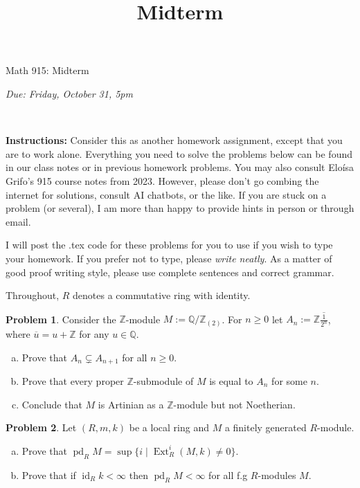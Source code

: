 \documentclass[11pt]{article}
\title{}
\date{\vspace{-0.5in}}
\title{Midterm}
\newcommand{\Z}{\mathbb{Z}}
\theoremstyle{definition}
\newtheorem{problem}{Problem}
\newcommand{\Q}{\mathbb{Q}}
\newcommand{\pd}{\operatorname{pd}}
\newcommand{\Ext}{\operatorname{Ext}}
\begin{document}
\vspace{3em}

\begin{center}
	{\LARGE Math 915: Midterm}
\end{center}
\begin{center}
{\it Due:  Friday, October 31, 5pm}
\end{center}

\

\noindent
{\bf Instructions:}  Consider this as another homework assignment, except that you are to work alone.  Everything you need to solve the problems below can be found in our class notes or in previous homework problems.  You may also consult Elo\'isa Grifo's 915 course notes from 2023.  However, please don't go combing the internet for solutions, consult AI chatbots, or the like.  If you are stuck on a problem (or several), I am more than happy to provide hints in person or through email.  

\medskip
\noindent
I will post the .tex code for these problems for you to use if you wish to type your homework. If you prefer not to type, please  {\em write neatly}. As a matter of good proof writing style, please use complete sentences and correct grammar. 


\medskip
\noindent
Throughout, $R$ denotes a commutative ring with identity.

\medskip

\begin{problem}  Consider the $\Z$-module $M:=\Q/\Z_{(2)}$.  For $n\ge 0$ let $A_n:=\Z \overline{\frac{1}{2^n}}$, where $\overline{u}=u+\Z$ for any $u\in \Q$.
\begin{enumerate}[(a)]
\item Prove that $A_n\subsetneq A_{n+1}$ for all $n\ge 0$.
\item Prove that every proper $\Z$-submodule of $M$ is equal to $A_n$ for some $n$.
\item Conclude that $M$ is Artinian as a $\Z$-module but not Noetherian.
\end{enumerate}
\end{problem}

\medskip



\begin{problem} Let $(R,m,k)$ be a local ring and $M$ a finitely generated $R$-module.  
\begin{enumerate}[(a)]
\item Prove that $\pd_R M=\sup\{i\mid \Ext^i_R(M,k)\neq 0\}$.
\item Prove that if $\operatorname{id}_R k<\infty$ then $\pd_R M<\infty$ for all f.g $R$-modules $M$.
\end{enumerate}
\end{problem}
\end{document}
